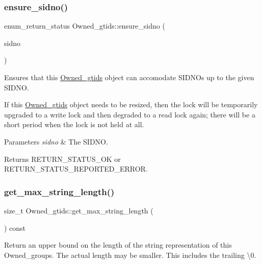 \subsubsection{\texorpdfstring{ensure\+\_\+sidno()}{ensure\_sidno()}}
{\footnotesize\ttfamily enum\+\_\+return\+\_\+status Owned\+\_\+gtids\+::ensure\+\_\+sidno (\begin{DoxyParamCaption}\item[{rpl\+\_\+sidno}]{sidno }\end{DoxyParamCaption})}

Ensures that this \mbox{\hyperlink{classOwned__gtids}{Owned\+\_\+gtids}} object can accomodate S\+I\+D\+N\+Os up to the given S\+I\+D\+NO.

If this \mbox{\hyperlink{classOwned__gtids}{Owned\+\_\+gtids}} object needs to be resized, then the lock will be temporarily upgraded to a write lock and then degraded to a read lock again; there will be a short period when the lock is not held at all.


\begin{DoxyParams}{Parameters}
{\em sidno} & The S\+I\+D\+NO. \\
\hline
\end{DoxyParams}
\begin{DoxyReturn}{Returns}
R\+E\+T\+U\+R\+N\+\_\+\+S\+T\+A\+T\+U\+S\+\_\+\+OK or R\+E\+T\+U\+R\+N\+\_\+\+S\+T\+A\+T\+U\+S\+\_\+\+R\+E\+P\+O\+R\+T\+E\+D\+\_\+\+E\+R\+R\+OR. 
\end{DoxyReturn}
\mbox{\label{classOwned__gtids_a0d71e2cdcab169bbe86b9f6067b1c93a}} 
\subsubsection{\texorpdfstring{get\+\_\+max\+\_\+string\+\_\+length()}{get\_max\_string\_length()}}
{\footnotesize\ttfamily size\+\_\+t Owned\+\_\+gtids\+::get\+\_\+max\+\_\+string\+\_\+length (\begin{DoxyParamCaption}{ }\end{DoxyParamCaption}) const\hspace{0.3cm}{\ttfamily [inline]}}

Return an upper bound on the length of the string representation of this Owned\+\_\+groups. The actual length may be smaller. This includes the trailing \textquotesingle{}\textbackslash{}0\textquotesingle{}. \mbox{\label{classOwned__gtids_a39d5a45f8d36a5ae5efb668babcd9e09}} 
